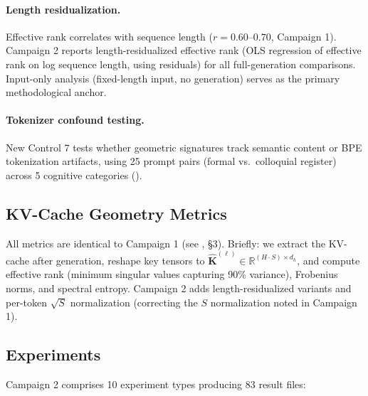 \documentclass[11pt,a4paper]{article}
\begin{document}
\paragraph{Length residualization.} Effective rank correlates with sequence length ($r = 0.60$--$0.70$, Campaign 1). Campaign 2 reports length-residualized effective rank (OLS regression of effective rank on log sequence length, using residuals) for all full-generation comparisons. Input-only analysis (fixed-length input, no generation) serves as the primary methodological anchor.

\paragraph{Tokenizer confound testing.} New Control 7 tests whether geometric signatures track semantic content or BPE tokenization artifacts, using 25 prompt pairs (formal vs.\ colloquial register) across 5 cognitive categories ().

\subsection{KV-Cache Geometry Metrics}

All metrics are identical to Campaign 1 (see \citealt{lyra2026campaign1}, \S3). Briefly: we extract the KV-cache after generation, reshape key tensors to $\hat{\mathbf{K}}^{(\ell)} \in \mathbb{R}^{(H \cdot S) \times d_h}$, and compute effective rank (minimum singular values capturing 90\% variance), Frobenius norms, and spectral entropy. Campaign 2 adds length-residualized variants and per-token $\sqrt{S}$ normalization (correcting the $S$ normalization noted in Campaign 1).

\subsection{Experiments}

Campaign 2 comprises 10 experiment types producing 83 result files:
\end{document}
